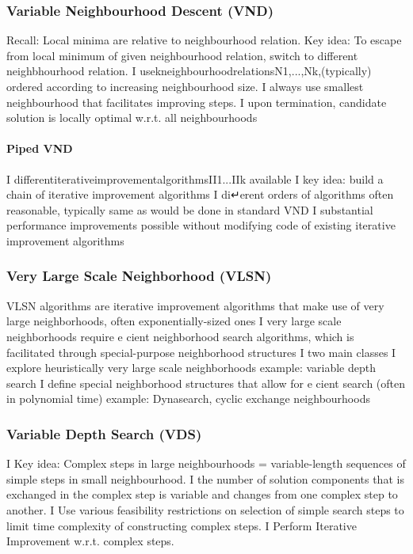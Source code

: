 \documentclass[a4paper,10pt]{article}
\begin{document}
		\subsubsection{Variable Neighbourhood Descent (VND)}
Recall: Local minima are relative to neighbourhood relation.
Key idea: To escape from local minimum of given neighbourhood relation, switch to different neighbhourhood relation.
I usekneighbourhoodrelationsN1,...,Nk,(typically) ordered according to increasing neighbourhood size.
I always use smallest neighbourhood that facilitates improving steps.
I upon termination, candidate solution is locally optimal w.r.t. all neighbourhoods
	
\paragraph{Piped VND}
I differentiterativeimprovementalgorithmsII1...IIk available
I key idea: build a chain of iterative improvement algorithms
I di↵erent orders of algorithms often reasonable, typically same as would be done in standard VND
I substantial performance improvements possible without modifying code of existing iterative improvement algorithms
	
\subsubsection{Very Large Scale Neighborhood (VLSN)} VLSN algorithms are iterative improvement algorithms that make use of very large neighborhoods, often exponentially-sized ones
I very large scale neighborhoods require e cient neighborhood search algorithms, which is facilitated through special-purpose neighborhood structures
I two main classes
I explore heuristically very large scale neighborhoods example: variable depth search
I define special neighborhood structures that allow for e cient search (often in polynomial time)
example: Dynasearch, cyclic exchange neighbourhoods


\subsubsection{Variable Depth Search (VDS)}
I Key idea: Complex steps in large neighbourhoods = variable-length sequences of simple steps in small neighbourhood.
I the number of solution components that is exchanged in the complex step is variable and changes from one complex step to another.
I Use various feasibility restrictions on selection of simple search steps to limit time complexity of constructing complex steps.
I Perform Iterative Improvement w.r.t. complex steps.
\end{document}
